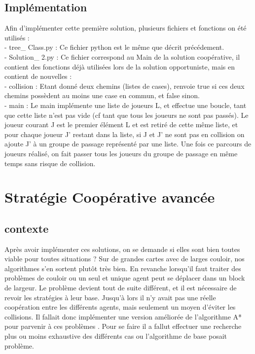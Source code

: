 \documentclass{article}
\begin{document}
\subsection{Implémentation}

Afin d'implémenter cette première solution, plusieurs fichiers et fonctions on été utilisés : \\ 

- tree\_ Class.py : Ce fichier python est le même que décrit précédement.\\ 

- Solution\_ 2.py : Ce fichier correspond au Main de la solution coopérative, il contient des fonctions déjà utilisées lors de la solution opportuniste, mais en contient de nouvelles : \\ 

- collision : Etant donné deux chemins (listes de cases), renvoie true si ces deux chemins possèdent au moins une case en commun, et false sinon. \\ 
	
- main : Le main implémente une liste de joueurs L, et effectue une boucle, tant que cette liste n'est pas vide (cf tant que tous les joueurs ne sont pas passés). Le joueur courant J est le premier élément L et est retiré de cette même liste, et pour chaque joueur J' restant dans la liste, si J et J' ne sont pas en collision on ajoute J' à un groupe de passage représenté par une liste. Une fois ce parcours de joueurs réalisé, on fait passer tous les joueurs du groupe de passage en même temps sans risque de collision.\\
\newpage
\section{Stratégie Coopérative avancée}

\subsection{contexte}

Après avoir implémenter ces solutions, on se demande si elles sont bien toutes viable pour toutes situations ? Sur de grandes cartes avec de larges couloir, nos algorithmes s’en sortent plutôt très bien. En revanche lorsqu’il faut traiter des problèmes de couloir ou un seul et unique agent peut se déplacer dans un block de largeur. Le problème devient tout de suite différent, et  il est nécessaire de revoir les stratégies à leur base. Jusqu'à lors il n’y avait pas une réelle coopération entre les différents agents, mais seulement un moyen d’éviter les collisions. Il fallait donc implémenter une version améliorée de l’algorithme A* pour parvenir à ces problèmes . Pour se faire il a fallut effectuer une recherche plus ou moins exhaustive des différents cas ou l’algorithme de base posait problème.
\end{document}
